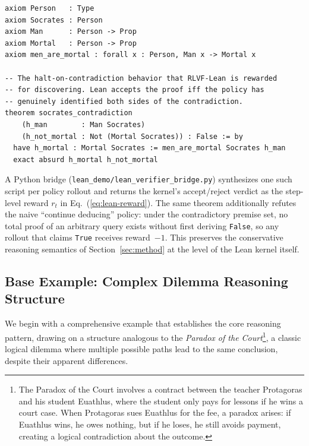 \documentclass{article}
\begin{document}
\begin{verbatim}
axiom Person   : Type
axiom Socrates : Person
axiom Man      : Person -> Prop
axiom Mortal   : Person -> Prop
axiom men_are_mortal : forall x : Person, Man x -> Mortal x

-- The halt-on-contradiction behavior that RLVF-Lean is rewarded
-- for discovering. Lean accepts the proof iff the policy has
-- genuinely identified both sides of the contradiction.
theorem socrates_contradiction
    (h_man        : Man Socrates)
    (h_not_mortal : Not (Mortal Socrates)) : False := by
  have h_mortal : Mortal Socrates := men_are_mortal Socrates h_man
  exact absurd h_mortal h_not_mortal
\end{verbatim}

A Python bridge (\texttt{lean\_demo/lean\_verifier\_bridge.py}) synthesizes
one such script per policy rollout and returns the kernel's accept/reject
verdict as the step-level reward $r_t$ in Eq.~(\ref{eq:lean-reward}). The
same theorem additionally refutes the naive ``continue deducing'' policy:
under the contradictory premise set, no total proof of an arbitrary query
exists without first deriving \texttt{False}, so any rollout that claims
\texttt{True} receives reward~$-1$. This preserves the conservative
reasoning semantics of Section~\ref{sec:method} at the level of the Lean
kernel itself.

\subsection{Base Example: Complex Dilemma Reasoning Structure}
\label{app:base-example}
We begin with a comprehensive example that establishes the core reasoning pattern, drawing on a structure analogous to the \textit{Paradox of the Court}\footnote{The Paradox of the Court involves a contract between the teacher Protagoras and his student Euathlus, where the student only pays for lessons if he wins a court case. When Protagoras sues Euathlus for the fee, a paradox arises: if Euathlus wins, he owes nothing, but if he loses, he still avoids payment, creating a logical contradiction about the outcome.}, a classic logical dilemma where multiple possible paths lead to the same conclusion, despite their apparent differences.
\end{document}
